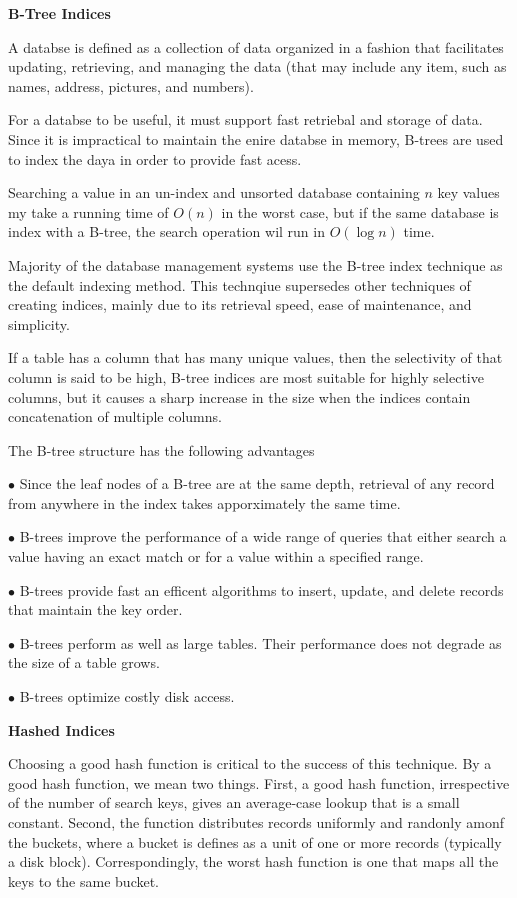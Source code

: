 \filbreak
\vskip 1cm
{\bf B-Tree Indices}

\vskip 1mm
A databse is defined as a collection of data organized in a fashion that facilitates updating, retrieving, and managing the data (that may include any item, such as names, address, pictures, and numbers).

\vskip 1mm
For a databse to be useful, it must support fast retriebal and storage of data. Since it is impractical to maintain the enire databse in memory, B-trees are used to index the daya in order to provide fast acess.

\vskip 1mm
Searching a value in an un-index and unsorted database containing $n$ key values my take a running time of $O(n)$ in the worst case, but if the same database is index with a B-tree, the search operation wil run in $O(\log n)$ time.

\vskip 1mm
Majority of the database management systems use the B-tree index technique as the default indexing method. This technqiue supersedes other techniques of creating indices, mainly due to its retrieval speed, ease of maintenance, and simplicity.

\vskip 1mm
If a table has a column that has many unique values, then the selectivity of that column is said to be high, B-tree indices are most suitable for highly selective columns, but it causes a sharp increase in the size when the indices contain concatenation of multiple columns.

\vskip 1mm
The B-tree structure has the following advantages

\vskip 3mm
\qquad$\bullet$ Since the leaf nodes of a B-tree are at the same depth, retrieval of any record from anywhere in the index takes apporximately the same time.

\vskip 3mm
\qquad$\bullet$ B-trees improve the performance of a wide range of queries that either search a value having an exact match or for a value within a specified range.

\vskip 3mm
\qquad$\bullet$ B-trees provide fast an efficent algorithms to insert, update, and delete records that maintain the key order.

\vskip 3mm
\qquad$\bullet$ B-trees perform as well as large tables. Their performance does not degrade as the size of a table grows.

\vskip 3mm
\qquad$\bullet$ B-trees optimize costly disk access.

\filbreak
\vskip 1cm
{\bf Hashed Indices}

\vskip 1mm
Choosing a good hash function is critical to the success of this technique. By a good hash function, we mean two things. First, a good hash function, irrespective of the number of search keys, gives an average-case lookup that is a small constant. Second, the function distributes records uniformly and randonly amonf the buckets, where a bucket is defines as a unit of one or more records (typically a disk block). Correspondingly, the worst hash function is one that maps all the keys to the same bucket.

